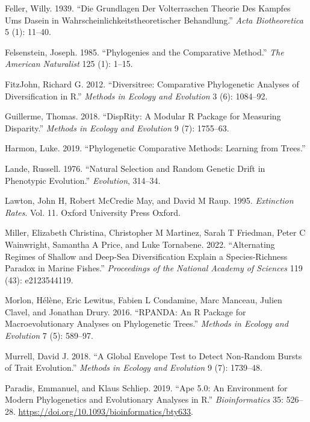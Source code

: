 \documentclass[
]{article}
\newlength{\cslhangindent}
\newenvironment{cslreferences}%
  {\setlength{\parindent}{0pt}%
  \everypar{\setlength{\hangindent}{\cslhangindent}}\ignorespaces}%
  {\par}
\begin{document}
\begin{cslreferences}
\leavevmode\hypertarget{ref-feller1939birthdeath}{}%
Feller, Willy. 1939. ``Die Grundlagen Der Volterraschen Theorie Des
Kampfes Ums Dasein in Wahrscheinlichkeitstheoretischer Behandlung.''
\emph{Acta Biotheoretica} 5 (1): 11--40.

\leavevmode\hypertarget{ref-felsensteinPCM}{}%
Felsenstein, Joseph. 1985. ``Phylogenies and the Comparative Method.''
\emph{The American Naturalist} 125 (1): 1--15.

\leavevmode\hypertarget{ref-diversitree}{}%
FitzJohn, Richard G. 2012. ``Diversitree: Comparative Phylogenetic
Analyses of Diversification in R.'' \emph{Methods in Ecology and
Evolution} 3 (6): 1084--92.

\leavevmode\hypertarget{ref-dispRity}{}%
Guillerme, Thomas. 2018. ``DispRity: A Modular R Package for Measuring
Disparity.'' \emph{Methods in Ecology and Evolution} 9 (7): 1755--63.

\leavevmode\hypertarget{ref-harmon2019book}{}%
Harmon, Luke. 2019. ``Phylogenetic Comparative Methods: Learning from
Trees.''

\leavevmode\hypertarget{ref-lande1976OU}{}%
Lande, Russell. 1976. ``Natural Selection and Random Genetic Drift in
Phenotypic Evolution.'' \emph{Evolution}, 314--34.

\leavevmode\hypertarget{ref-lawton1995extinction}{}%
Lawton, John H, Robert McCredie May, and David M Raup. 1995.
\emph{Extinction Rates}. Vol. 11. Oxford University Press Oxford.

\leavevmode\hypertarget{ref-miller2022alternating}{}%
Miller, Elizabeth Christina, Christopher M Martinez, Sarah T Friedman,
Peter C Wainwright, Samantha A Price, and Luke Tornabene. 2022.
``Alternating Regimes of Shallow and Deep-Sea Diversification Explain a
Species-Richness Paradox in Marine Fishes.'' \emph{Proceedings of the
National Academy of Sciences} 119 (43): e2123544119.

\leavevmode\hypertarget{ref-rpanda}{}%
Morlon, Hélène, Eric Lewitus, Fabien L Condamine, Marc Manceau, Julien
Clavel, and Jonathan Drury. 2016. ``RPANDA: An R Package for
Macroevolutionary Analyses on Phylogenetic Trees.'' \emph{Methods in
Ecology and Evolution} 7 (5): 589--97.

\leavevmode\hypertarget{ref-murrell2018global}{}%
Murrell, David J. 2018. ``A Global Envelope Test to Detect Non-Random
Bursts of Trait Evolution.'' \emph{Methods in Ecology and Evolution} 9
(7): 1739--48.

\leavevmode\hypertarget{ref-ape}{}%
Paradis, Emmanuel, and Klaus Schliep. 2019. ``Ape 5.0: An Environment
for Modern Phylogenetics and Evolutionary Analyses in R.''
\emph{Bioinformatics} 35: 526--28.
\url{https://doi.org/10.1093/bioinformatics/bty633}.


\end{cslreferences}
\end{document}
